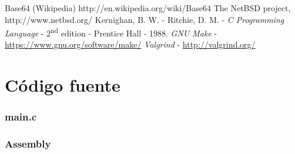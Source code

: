 \documentclass[10pt,a4paper]{article}
\begin{document}
\begin{thebibliography}{10}
	\bibitem{}Base64 (Wikipedia) http://en.wikipedia.org/wiki/Base64
	\bibitem{}The NetBSD project, http://www.netbsd.org/
	 Kernighan, B. W. - Ritchie, D. M. - \emph{C Programming Language} - 2\textsuperscript{nd} edition - Prentice Hall - 1988.
	 \emph{GNU Make} - \hyperlink{make}{https://www.gnu.org/software/make/}
	 \emph{Valgrind} - \hyperlink{valgrind}{http://valgrind.org/}

\end{thebibliography}
\newpage
\appendix
\section{Código fuente}\label{appendix_codigo_fuente}

\subsubsection{main.c}\label{main}


\newpage

\subsubsection{Assembly}\label{main.s}

\end{document}
